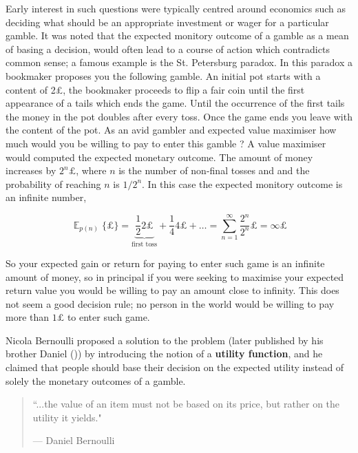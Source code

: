 Early interest in such questions were typically centred around economics such as deciding what should be an appropriate 
investment or wager for a particular gamble. It was noted that the expected monitory outcome of a gamble as a mean of basing a 
decision, would often lead to a course of action which contradicts common sense; a famous example is the St. Petersburg paradox.
In this paradox a bookmaker proposes you the following gamble. An initial pot starts with a content of 2\pounds, the bookmaker proceeds 
to flip a fair coin until the first appearance of a tails which ends the game. Until the occurrence of the first tails 
the money in the pot doubles after every toss. Once the game ends you leave with the content of the pot. As an avid gambler 
and expected value maximiser how much would you be willing to pay to enter this gamble ? A value maximiser would computed 
the expected monetary outcome. The amount of money increases by $2^{n}\pounds$, where $n$ is the number of non-final tosses and 
and the probability of reaching $n$ is $1/2^{n}$. In this case the expected monitory outcome is an infinite number,

\begin{equation*}
\displaystyle \mathop{\mathbb{E}}_{p(n)}\{\pounds\} = \underbrace{\frac{1}{2} 2 \pounds}_{\textrm{first toss}} + \frac{1}{4} 4 \pounds + \dots = \sum\limits_{n=1}^{\infty} 
\frac{2^{n}}{2^{n}}\pounds = \infty \pounds 
\end{equation*}

So your expected gain or return for paying to enter such game is an infinite amount of money, so in principal if you were
seeking to maximise your expected return value you would be willing to pay an amount close to infinity. This does not 
seem a good decision rule; no person in the world would be willing to pay more than $1\pounds$ to enter such game.

Nicola Bernoulli proposed a solution to the problem (later published by his brother Daniel  (\cite{Bernoulli1954})) by introducing the notion 
of a \textbf{utility function}, and he claimed that people should base their decision on the expected utility instead 
of solely the monetary outcomes of a gamble.

\begin{quote}
  \onehalfspacing%
  ``...the value of an item must not be based on its price, but rather on the utility it yields."\par\raggedleft--- \textup{Daniel Bernoulli}
\end{quote}

